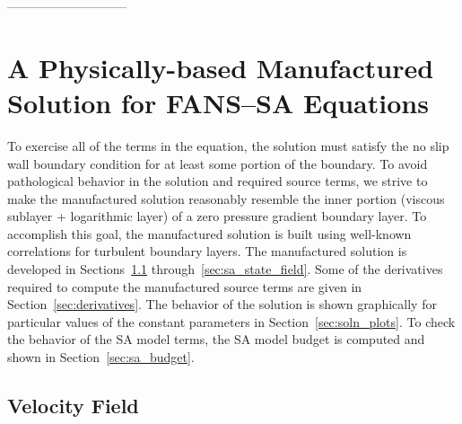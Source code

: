 -----------------------------
\section{A Physically-based Manufactured Solution for FANS--SA Equations}\label{oliver}
 To exercise all of the terms in the equation, the solution must satisfy the no slip wall boundary condition for at least
some portion of the boundary.  To avoid pathological behavior in the solution and required source terms, we strive to make the manufactured
solution reasonably resemble the inner portion (viscous sublayer + logarithmic layer) of a zero pressure gradient boundary layer.  To
accomplish this goal, the manufactured solution is built using well-known correlations for turbulent boundary layers.  The
manufactured solution is developed in Sections~\ref{sec:velocity_field} through~\ref{sec:sa_state_field}.
Some of the derivatives required to compute the manufactured source
terms are given in Section~\ref{sec:derivatives}.  The
behavior of the solution is shown graphically for particular values of
the constant parameters in Section~\ref{sec:soln_plots}.  To check the
behavior of the SA model terms, the SA model budget is computed and
shown in Section~\ref{sec:sa_budget}.


\subsection{Velocity Field} \label{sec:velocity_field}

